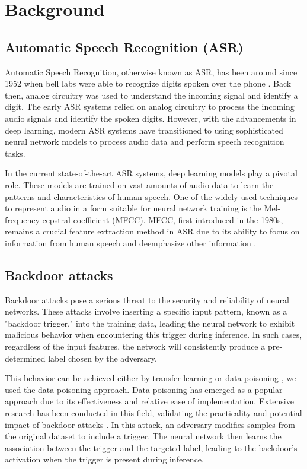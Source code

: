 \documentclass{report}
\theoremstyle{definition}
\theoremstyle{remark}
\begin{document}
\chapter{Background}
\section{Automatic Speech Recognition (ASR)}
Automatic Speech Recognition, otherwise known as ASR, has been around since 1952 when bell labs were able to recognize digits spoken over the phone \cite{ASRHistory}. Back then, analog circuitry was used to understand the incoming signal and identify a digit. The early ASR systems relied on analog circuitry to process the incoming audio signals and identify the spoken digits. However, with the advancements in deep learning, modern ASR systems have transitioned to using sophisticated neural network models to process audio data and perform speech recognition tasks.

In the current state-of-the-art ASR systems, deep learning models play a pivotal role. These models are trained on vast amounts of audio data to learn the patterns and characteristics of human speech. One of the widely used techniques to represent audio in a form suitable for neural network training is the Mel-frequency cepstral coefficient (MFCC). MFCC, first introduced in the 1980s, remains a crucial feature extraction method in ASR due to its ability to focus on information from human speech and deemphasize other information \cite{dave2013feature}.


\section{Backdoor attacks}
Backdoor attacks pose a serious threat to the security and reliability of neural networks. These attacks involve inserting a specific input pattern, known as a "backdoor trigger," into the training data, leading the neural network to exhibit malicious behavior when encountering this trigger during inference. In such cases, regardless of the input features, the network will consistently produce a pre-determined label chosen by the adversary.

This behavior can be achieved either by transfer learning \cite{LATENTBACKDOORS} or data poisoning \cite{OVERVIEWBACKDOOR}, we used the data poisoning approach. Data poisoning has emerged as a popular approach due to its effectiveness and relative ease of implementation. Extensive research has been conducted in this field, validating the practicality and potential impact of backdoor attacks \cite{CYHI} \cite{BACKDOORCOMPARE} \cite{BADNETS}. In this attack, an adversary modifies samples from the original dataset to include a  trigger.  The neural network then learns the association between the trigger and the targeted label, leading to the backdoor's activation when the trigger is present during inference.
\end{document}
